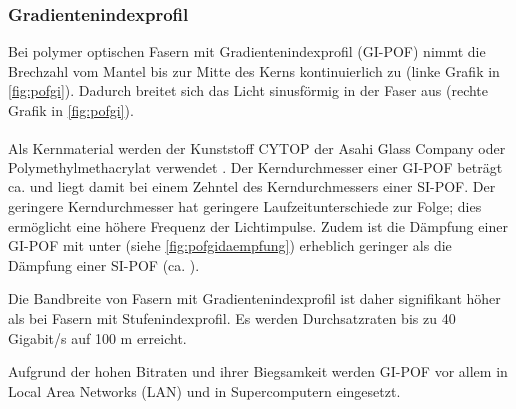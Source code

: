 \subsubsection{Gradientenindexprofil}

Bei polymer optischen Fasern mit Gradientenindexprofil (GI-POF) nimmt die
Brechzahl vom Mantel bis zur Mitte des Kerns kontinuierlich zu (linke Grafik in
\autoref{fig:pofgi}). Dadurch breitet sich das Licht sinusförmig in der Faser
aus (rechte Grafik in \autoref{fig:pofgi}).

Als Kernmaterial werden der Kunststoff CYTOP\textsuperscript{\texttrademark} der
Asahi Glass Company oder Polymethylmethacrylat verwendet \cite{pofacgif}. Der
Kerndurchmesser einer GI-POF beträgt ca.  und liegt damit bei
einem Zehntel des Kerndurchmessers einer SI-POF. Der geringere Kerndurchmesser
hat geringere Laufzeitunterschiede zur Folge; dies ermöglicht eine höhere
Frequenz der Lichtimpulse. Zudem ist die Dämpfung einer GI-POF mit unter
 (siehe \autoref{fig:pofgidaempfung}) erheblich geringer als
die Dämpfung einer SI-POF (ca. ).

Die Bandbreite von Fasern mit Gradientenindexprofil ist daher signifikant höher
als bei Fasern mit Stufenindexprofil. Es werden Durchsatzraten bis zu 40
Gigabit/s auf 100 m erreicht.

Aufgrund der hohen Bitraten und ihrer Biegsamkeit werden GI-POF vor allem in
\glqq Local Area Networks\grqq{} (LAN) und in Supercomputern eingesetzt.
\cite{poflee}

